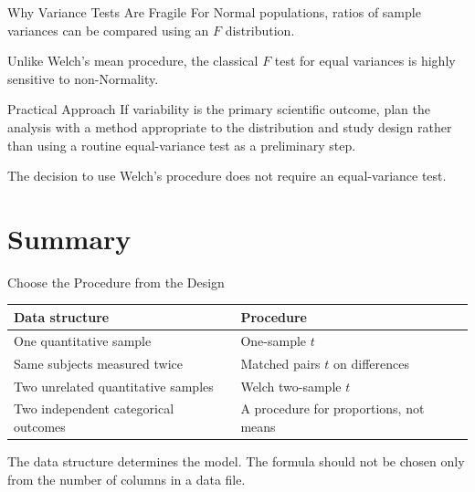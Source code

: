 \documentclass[aspectratio=169,10pt]{beamer}
\begin{document}
\begin{frame}{Why Variance Tests Are Fragile}
For Normal populations, ratios of sample variances can be compared using an $F$ distribution.

\vspace{0.2cm}
Unlike Welch's mean procedure, the classical $F$ test for equal variances is highly sensitive to non-Normality.

\begin{block}{Practical Approach}
If variability is the primary scientific outcome, plan the analysis with a method appropriate to the distribution and study design rather than using a routine equal-variance test as a preliminary step.
\end{block}

The decision to use Welch's procedure does not require an equal-variance test.
\end{frame}


\section{Summary}

\begin{frame}{Choose the Procedure from the Design}
\begin{center}
\begin{tabularx}{0.94\textwidth}{>{\RaggedRight\arraybackslash}p{} X}
\toprule
\textbf{Data structure} & \textbf{Procedure} \\
\midrule
One quantitative sample & One-sample $t$ \\
Same subjects measured twice & Matched pairs $t$ on differences \\
Two unrelated quantitative samples & Welch two-sample $t$ \\
Two independent categorical outcomes & A procedure for proportions, not means \\
\bottomrule
\end{tabularx}
\end{center}

The data structure determines the model. The formula should not be chosen only from the number of columns in a data file.
\end{frame}
\end{document}

